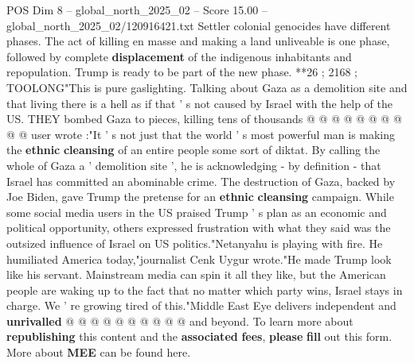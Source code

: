 \begin{textsample}{POS Dim 8 – global\_north\_2025\_02 – Score 15.00 – global\_north\_2025\_02/120916421.txt}
Settler colonial genocides have different phases.
The act of killing en masse and making a land unliveable is one phase, followed by complete \textbf{displacement} of the indigenous inhabitants and repopulation.
Trump is ready to be part of the new phase. **26 ; 2168 ; TOOLONG"This is pure gaslighting.
Talking about Gaza as a demolition site and that living there is a hell as if that ' s not caused by Israel with the help of the US.
THEY bombed Gaza to pieces, killing tens of thousands @ @ @ @ @ @ @ @ @ @ user wrote :"It ' s not just that the world ' s most powerful man is making the \textbf{ethnic} \textbf{cleansing} of an entire people some sort of diktat.
By calling the whole of Gaza a ' demolition site ', he is acknowledging - by definition - that Israel has committed an abominable crime.
The destruction of Gaza, backed by Joe Biden, gave Trump the pretense for an \textbf{ethnic} \textbf{cleansing} campaign.
While some social media users in the US praised Trump ' s plan as an economic and political opportunity, others expressed frustration with what they said was the outsized influence of Israel on US politics."Netanyahu is playing with fire.
He humiliated America today,"journalist Cenk Uygur wrote."He made Trump look like his servant.
Mainstream media can spin it all they like, but the American people are waking up to the fact that no matter which party wins, Israel stays in charge.
We ' re growing tired of this."Middle East Eye delivers independent and \textbf{unrivalled} @ @ @ @ @ @ @ @ @ @ and beyond.
To learn more about \textbf{republishing} this content and the \textbf{associated} \textbf{fees}, \textbf{please} \textbf{fill} out this form.
More about \textbf{MEE} can be found here.

\end{textsample}
